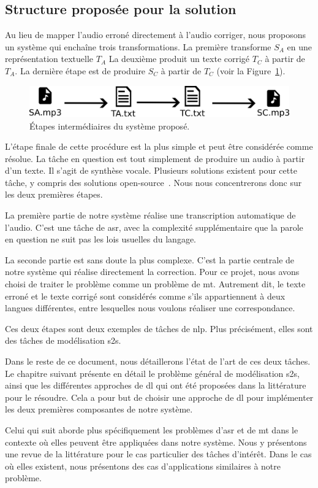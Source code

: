 \subsection{Structure proposée pour la solution}

Au lieu de mapper l'audio erroné directement à l'audio corriger,
nous proposons un système qui enchaîne trois transformations.
La première transforme \(S_A\) en une représentation textuelle \(T_A\)
La deuxième produit un texte corrigé \(T_C\) à partir de \(T_A\).
La dernière étape est de produire \(S_C\) à partir de \(T_C\) (voir la Figure~\ref{fig.detail-system}).

\begin{figure}[hbt]
    \centering
    \includegraphics[width=\linewidth]{assets/images/detail.png}
    \caption{Étapes intermédiaires du système proposé.}
    \label{fig.detail-system}
\end{figure}

L'étape finale de cette procédure est la plus simple et peut être considérée comme résolue.
La tâche en question est tout simplement de produire un audio à partir d'un texte.
Il s'agit de synthèse vocale.
Plusieurs solutions existent pour cette tâche, y compris des solutions open-source~\cite{Tan_et_al._2022}.
Nous nous concentrerons donc sur les deux premières étapes.

La première partie de notre système réalise une transcription automatique de l'audio.
C'est une tâche de \gls{asr}, 
avec la complexité supplémentaire que la parole en question ne suit pas les lois usuelles du langage.

La seconde partie est sans doute la plus complexe.
C'est la partie centrale de notre système qui réalise directement la correction.
Pour ce projet, nous avons choisi de traiter le problème comme un problème de \gls{mt}.
Autrement dit, le texte erroné et le texte corrigé 
sont considérés comme s'ils appartiennent à deux langues différentes,
entre lesquelles nous voulons réaliser une correspondance.

Ces deux étapes sont deux exemples de tâches de \gls{nlp}.
Plus précisément, elles sont des tâches de modélisation \gls{s2s}.

Dans le reste de ce document, nous détaillerons l'état de l'art de ces deux tâches.
Le chapitre suivant présente en détail le problème général de modélisation \gls{s2s},
ainsi que les différentes approches de \gls{dl} 
qui ont été proposées dans la littérature pour le résoudre.
Cela a pour but de choisir une approche de \gls{dl} 
pour implémenter les deux premières composantes de notre système.

Celui qui suit aborde plus spécifiquement les problèmes d'\gls{asr} et de \gls{mt}
dans le contexte où elles peuvent être appliquées dans notre système.
Nous y présentons une revue de la littérature pour le cas particulier des tâches d'intérêt.
Dans le cas où elles existent, nous présentons des cas d'applications similaires à notre problème.
